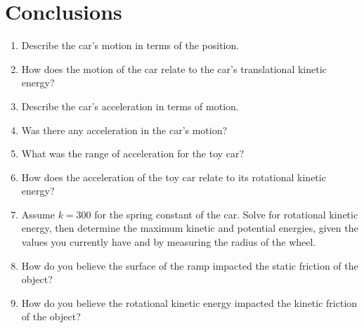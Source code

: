 \documentclass[12pt, letterpaper]{report}
\begin{document}
    \section{Conclusions}
      \begin{enumerate}
        \item{Describe the car's motion in terms of the position.}
        \item{How does the motion of the car relate to the car's translational kinetic energy?}
        \item{Describe the car's acceleration in terms of motion.}
        \item{Was there any acceleration in the car's motion?}
        \item{What was the range of acceleration for the toy car?}
        \item{How does the acceleration of the toy car relate to its rotational kinetic energy?}
        \item{Assume $k=300$ for the spring constant of the car. Solve for rotational kinetic energy, then determine the maximum kinetic and potential energies, given the values you currently have and by measuring the radius of the wheel.}
        \item{How do you believe the surface of the ramp impacted the static friction of the object?}
        \item{How do you believe the rotational kinetic energy impacted the kinetic friction of the object?}
      \end{enumerate}
\pagebreak
\end{document}
